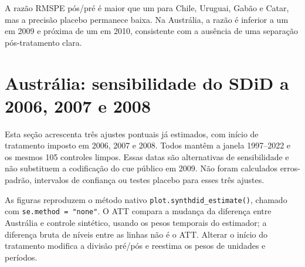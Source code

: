 \documentclass[
  brazilian,
  11pt,
]{article}
\begin{document}
\begin{table}[H]
\centering
\caption{\label{tab:table-sdid-fit}Diagnósticos de ajuste pré e pós-tratamento dos SDiD.}
\centering
{}
\end{table}

A razão RMSPE pós/pré é maior que um para Chile, Uruguai, Gabão e Catar,
mas a precisão placebo permanece baixa. Na Austrália, a razão é inferior
a um em 2009 e próxima de um em 2010, consistente com a ausência de uma
separação pós-tratamento clara.

\clearpage

\section{Austrália: sensibilidade do SDiD a 2006, 2007 e
2008}\label{austruxe1lia-sensibilidade-do-sdid-a-2006-2007-e-2008}

Esta seção acrescenta três ajustes pontuais já estimados, com início de
tratamento imposto em 2006, 2007 e 2008. Todos mantêm a janela
1997--2022 e os mesmos 105 controles limpos. Essas datas são
alternativas de sensibilidade e não substituem a codificação do cue
público em 2009. Não foram calculados erros-padrão, intervalos de
confiança ou testes placebo para esses três ajustes.

As figuras reproduzem o método nativo
\texttt{plot.synthdid\_estimate()}, chamado com
\texttt{se.method = "none"}. O ATT compara a mudança da diferença entre
Austrália e controle sintético, usando os pesos temporais do estimador;
a diferença bruta de níveis entre as linhas não é o ATT. Alterar o
início do tratamento modifica a divisão pré/pós e reestima os pesos de
unidades e períodos.
\end{document}
